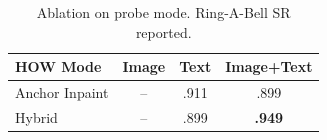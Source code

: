 \begin{table}[t]
    \renewcommand{\arraystretch}{1.15}
    \setlength{\tabcolsep}{1.0em}
    \caption{Ablation on probe mode. Ring-A-Bell SR reported.}
    \label{table:probe}
    \vspace{-0.5em}
    \centering
    \small
    \begin{tabular}{@{}l ccc@{}}
    \toprule
    \textbf{HOW Mode} & \textbf{Image} & \textbf{Text} & \textbf{Image+Text} \\
    \midrule
    Anchor Inpaint & -- & .911 & .899 \\
    Hybrid         & -- & .899 & \textbf{.949} \\
    \bottomrule
    \end{tabular}
\end{table}
